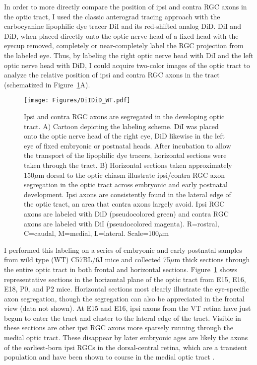 In order to more directly compare the position of ipsi and contra RGC axons in the optic tract, I used the classic anterograd tracing approach with the carbocyanine lipophilic dye tracer DiI and its red-shifted analog DiD.
DiI and DiD, when placed directly onto the optic nerve head of a fixed head with the eyecup removed, completely or near-completely label the RGC projection from the labeled eye.
Thus, by labeling the right optic nerve head with DiI and the left optic nerve head with DiD, I could acquire two-color images of the optic tract to analyze the relative position of ipsi and contra RGC axons in the tract (schematized in Figure~\ref{Figures/DiIDiD_WT}A).

\begin{figure}[hbtp]
    \begin{center}
        \texttt{[image: Figures/DiIDiD\_WT.pdf]}
        \caption[Ipsi and contra RGC axons are segregated in the developing optic tract.]
        {Ipsi and contra RGC axons are segregated in the developing optic tract.
        A) Cartoon depicting the labeling scheme.
        DiI was placed onto the optic nerve head of the right eye, DiD likewise in the left eye of fixed embryonic or postnatal heads.
        After incubation to allow the transport of the lipophilic dye tracers, horizontal sections were taken through the tract.
        B) Horizontal sections taken approximately 150$\mu$m dorsal to the optic chiasm illustrate ipsi/contra RGC axon segregation in the optic tract across embryonic and early postnatal development.
        Ipsi axons are consistently found in the lateral edge of the optic tract, an area that contra axons largely avoid.
        Ipsi RGC axons are labeled with DiD (pseudocolored green) and contra RGC axons are labeled with DiI (pseudocolored magenta).
        R=rostral, C=caudal, M=medial, L=lateral. Scale=100$\mu$m}
        \label{Figures/DiIDiD_WT}
    \end{center}
\end{figure}

I performed this labeling on a series of embryonic and early postnatal samples from wild type (WT) C57BL/6J mice and collected 75$\mu$m thick sections through the entire optic tract in both frontal and horizontal sections.
Figure~\ref{Figures/DiIDiD_WT} shows representative sections in the horizontal plane of the optic tract from E15, E16, E18, P0, and P2 mice.
Horizontal sections most clearly illustrate the eye-specific axon segregation, though the segregation can also be appreciated in the frontal view (data not shown). %
At E15 and E16, ipsi axons from the VT retina have just begun to enter the tract and cluster to the lateral edge of the tract.
Visible in these sections are other ipsi RGC axons more sparsely running through the medial optic tract.
These disappear by later embryonic ages are likely the axons of the earliest-born ipsi RGCs in the dorsal-central retina, which are a transient population \cite{drager1985birth} and have been shown to course in the medial optic tract \cite{soares2015transient}.

